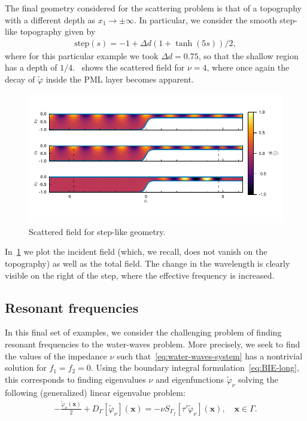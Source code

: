 \documentclass[review,hidelinks,onefignum,onetabnum]{siamart220329}
\newcommand{\bx}{\mathbf{x}}
\newcommand{\tvarphi}{\widetilde \varphi}
\begin{document}
The final geometry considered for the scattering problem is that of a topography with a different depth as $x_1 \to \pm \infty$. In particular, we consider the smooth step-like topography given by
\begin{align}
    \textrm{step}(s) = -1 + \Delta d (1+\tanh(5s))/2,
\end{align}
where for this particular example we took $\Delta d = 0.75$, so that the shallow region has a depth of $1/4$.~ shows the scattered field for $\nu=4$, where once again the decay of $\tvarphi$ inside the PML layer becomes apparent. 
\begin{figure}[ht!]
  \centering
  \vspace{-40pt}
  \includegraphics[width=1\textwidth]{step_fields.pdf}
  \vspace{-40pt}
  \caption{Scattered field for step-like geometry.}
  \label{fig:step-fields}
\end{figure}
In~\cref{fig:step-fields} we plot the incident field (which, we recall, does not vanish on the topography) as well as the total field. The change in the wavelength is clearly visible on the right of the step, where the effective frequency is increased. 

\subsection{Resonant frequencies}\label{sec:resonant-freq}

In this final set of examples, we consider the challenging problem of finding resonant frequencies to the water-waves problem. More precisely, we seek to find the values of the impedance $\nu$ such that~\cref{eq:water-waves-system} has a nontrivial solution for $f_1=f_2=0$. Using the boundary integral formulation~\cref{eq:BIE-long}, this corresponds to finding eigenvalues $\nu$ and eigenfunctions $\tvarphi_\nu$ solving the following (generalized) linear eigenvalue problem:
%
\begin{align}
  \label{eq:BIE-eigenvalue}
  -\frac{\tvarphi_\nu(\bx)}{2} + D_{\Gamma}[\tvarphi_\nu](\bx) =  -\nu S_{\Gamma_f}\left[\tau'\tvarphi_\nu\right](\bx), \quad \bx \in \Gamma.
\end{align}
%
\end{document}
